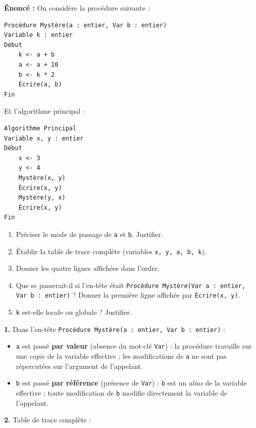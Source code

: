 \documentclass[11pt]{article}
\begin{document}
\begin{corrige}
\textbf{Énoncé :} On considère la procédure suivante :
\begin{lstlisting}
Procédure Mystère(a : entier, Var b : entier)
Variable k : entier
Début
    k <- a + b
    a <- a + 10
    b <- k * 2
    Écrire(a, b)
Fin
\end{lstlisting}
Et l'algorithme principal :
\begin{lstlisting}
Algorithme Principal
Variable x, y : entier
Début
    x <- 3
    y <- 4
    Mystère(x, y)
    Écrire(x, y)
    Mystère(y, x)
    Écrire(x, y)
Fin
\end{lstlisting}
\begin{enumerate}
  \item Préciser le mode de passage de \texttt{a} et \texttt{b}. Justifier.
  \item Établir la table de trace complète (variables \texttt{x, y, a, b, k}).
  \item Donner les quatre lignes affichées dans l'ordre.
  \item Que se passerait-il si l'en-tête était \texttt{Procédure Mystère(Var a : entier, Var b : entier)} ? Donner la première ligne affichée par \texttt{Écrire(x, y)}.
  \item \texttt{k} est-elle locale ou globale ? Justifier.
\end{enumerate}
\tcblower
\textbf{1.} Dans l'en-tête \texttt{Procédure Mystère(a : entier, Var b : entier)} :
\begin{itemize}
  \item \texttt{a} est passé \textbf{par valeur} (absence du mot-clé \texttt{Var}) : la procédure travaille sur une \emph{copie} de la variable effective ; les modifications de \texttt{a} ne sont pas répercutées sur l'argument de l'appelant.
  \item \texttt{b} est passé \textbf{par référence} (présence de \texttt{Var}) : \texttt{b} est un \emph{alias} de la variable effective ; toute modification de \texttt{b} modifie directement la variable de l'appelant.
\end{itemize}

\textbf{2.} Table de trace complète :


\end{corrige}
\end{document}
